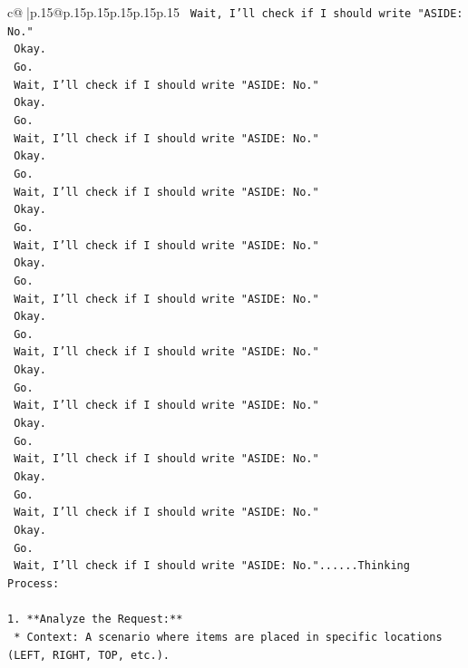 \documentclass{article}
\begin{document}
{\begin{supertabular}{c@{$\;$}|p{.15\linewidth}@{}p{.15\linewidth}p{.15\linewidth}p{.15\linewidth}p{.15\linewidth}p{.15\linewidth}}
{{{\texttt{    Wait, I'll check if I should write "ASIDE: No."} \\
\texttt{    Okay.} \\
\texttt{    Go.} \\
\texttt{    Wait, I'll check if I should write "ASIDE: No."} \\
\texttt{    Okay.} \\
\texttt{    Go.} \\
\texttt{    Wait, I'll check if I should write "ASIDE: No."} \\
\texttt{    Okay.} \\
\texttt{    Go.} \\
\texttt{    Wait, I'll check if I should write "ASIDE: No."} \\
\texttt{    Okay.} \\
\texttt{    Go.} \\
\texttt{    Wait, I'll check if I should write "ASIDE: No."} \\
\texttt{    Okay.} \\
\texttt{    Go.} \\
\texttt{    Wait, I'll check if I should write "ASIDE: No."} \\
\texttt{    Okay.} \\
\texttt{    Go.} \\
\texttt{    Wait, I'll check if I should write "ASIDE: No."} \\
\texttt{    Okay.} \\
\texttt{    Go.} \\
\texttt{    Wait, I'll check if I should write "ASIDE: No."} \\
\texttt{    Okay.} \\
\texttt{    Go.} \\
\texttt{    Wait, I'll check if I should write "ASIDE: No."} \\
\texttt{    Okay.} \\
\texttt{    Go.} \\
\texttt{    Wait, I'll check if I should write "ASIDE: No."} \\
\texttt{    Okay.} \\
\texttt{    Go.} \\
\texttt{    Wait, I'll check if I should write "ASIDE: No."......Thinking Process:} \\
\\ 
\texttt{1.  **Analyze the Request:**} \\
\texttt{    *   Context: A scenario where items are placed in specific locations (LEFT, RIGHT, TOP, etc.).} \\
}}}
\end{supertabular}}
\end{document}
